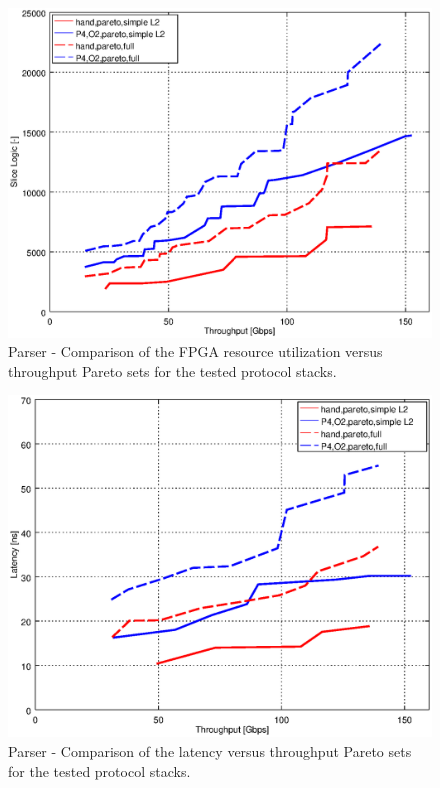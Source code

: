 \begin{figure}[b]
    \centering
    \includegraphics[scale=0.61]{chapters/pic/graphs/hfe/1_thrslice_logic_pareto}
    \caption{Parser - Comparison of the FPGA resource utilization versus throughput Pareto sets for the tested protocol stacks.}
    \label{fig:hfeParetoLut}
\end{figure}

\begin{figure}
    \centering
    \includegraphics[scale=0.61]{chapters/pic/graphs/hfe/2_thrlat_pareto}
    \caption{Parser - Comparison of the latency versus throughput Pareto sets for the tested protocol stacks.}
    \label{fig:hfeParetoLat}
\end{figure}

